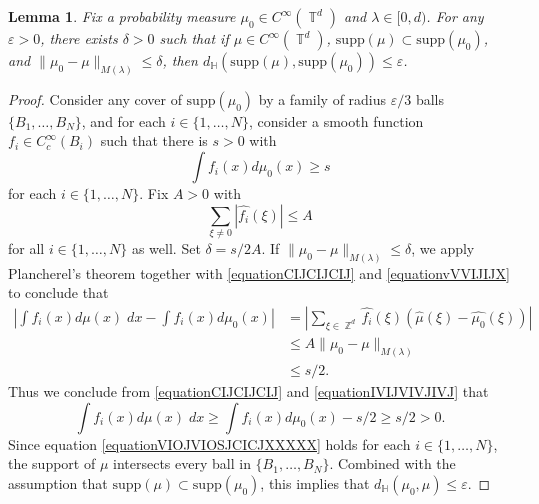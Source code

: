 \documentclass[dvipsnames,letterpaper,12pt]{article}
\numberwithin{equation}{section}
\DeclareMathOperator{\ZZ}{\mathbb{Z}}
\DeclareMathOperator{\TT}{\mathbb{T}}
\newtheorem{lemma}[theorem]{Lemma}
\numberwithin{theorem}{section}
\begin{document}
\begin{lemma} \label{LemmaTAOIAWOIDJ12301}
    Fix a probability measure $\mu_0 \in C^\infty(\TT^d)$ and $\lambda \in [0,d)$. For any $\varepsilon > 0$, there exists $\delta > 0$ such that if $\mu \in C^\infty(\TT^d)$, $\text{supp}(\mu) \subset \text{supp}(\mu_0)$, and $\| \mu_0 - \mu \|_{M(\lambda)} \leq \delta$, then $d_\mathbb{H}(\text{supp}(\mu),\text{supp}(\mu_0)) \leq \varepsilon$.
\end{lemma}
\begin{proof}
    Consider any cover of $\text{supp}(\mu_0)$ by a family of radius $\varepsilon/3$ balls $\{ B_1,\dots,B_N \}$, and for each $i \in \{ 1, \dots, N \}$, consider a smooth function $f_i \in C_c^\infty(B_i)$ such that there is $s > 0$ with
    \begin{equation} \label{equationCIJCIJCIJ}
        \int f_i(x) d\mu_0(x) \geq s
    \end{equation}
    for each $i \in \{ 1, \dots, N \}$. Fix $A > 0$ with
    \begin{equation} \label{equationvVVIJIJX}
        \sum_{\xi \neq 0} |\widehat{f_i}(\xi)| \leq A
    \end{equation}
    for all $i \in \{ 1, \dots, N \}$ as well. Set $\delta = s/2A$. If $\| \mu_0 - \mu \|_{M(\lambda)} \leq \delta$, we apply Plancherel's theorem together with \eqref{equationCIJCIJCIJ} and \eqref{equationvVVIJIJX} to conclude that
    \begin{equation} \label{equationIVIJVIVJIVJ}
    \begin{split}
        \left| \int f_i(x) d\mu(x)\; dx - \int f_i(x) d\mu_0(x) \right| &= \left| \sum_{\xi \in \ZZ^d} \widehat{f_i}(\xi) \left( \widehat{\mu}(\xi) - \widehat{\mu_0}(\xi) \right) \right|\\
        &\leq A \| \mu_0 - \mu \|_{M(\lambda)}\\
        &\leq s/2.
    \end{split}
    \end{equation}
    Thus we conclude from \eqref{equationCIJCIJCIJ} and \eqref{equationIVIJVIVJIVJ} that
    \begin{equation} \label{equationVIOJVIOSJCICJXXXXX}
        \int f_i(x) d\mu(x)\; dx \geq \int f_i(x) d\mu_0(x) - s/2 \geq s/2 > 0.
    \end{equation}
    Since equation \eqref{equationVIOJVIOSJCICJXXXXX} holds for each $i \in \{ 1,\dots, N \}$, the support of $\mu$ intersects every ball in $\{ B_1, \dots, B_N \}$. Combined with the assumption that $\text{supp}(\mu) \subset \text{supp}(\mu_0)$, this implies that $d_\mathbb{H}(\mu_0,\mu) \leq \varepsilon$.
\end{proof}
\end{document}
